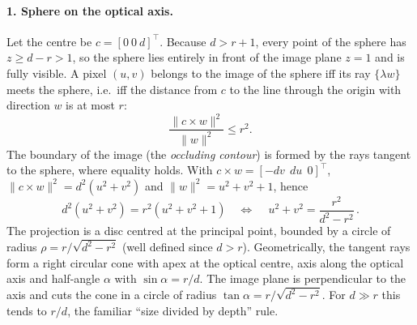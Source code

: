 \documentclass[11pt,a4paper]{article}
\begin{document}
\paragraph{1. Sphere on the optical axis.}
Let the centre be $c=[0\ 0\ d]^\top$. Because $d>r+1$, every point of the sphere has
$z\ge d-r>1$, so the sphere lies entirely in front of the image plane $z=1$ and is fully
visible. A pixel $(u,v)$ belongs to the image of the sphere iff its ray $\{\lambda w\}$
meets the sphere, i.e.\ iff the distance from $c$ to the line through the origin with
direction $w$ is at most $r$:
\begin{equation}
  \frac{\lVert c\times w\rVert^2}{\lVert w\rVert^2}\le r^2 .
\end{equation}
The boundary of the image (the \emph{occluding contour}) is formed by the rays tangent
to the sphere, where equality holds. With $c\times w=[-dv\ \ du\ \ 0]^\top$,
$\lVert c\times w\rVert^2=d^2(u^2+v^2)$ and $\lVert w\rVert^2=u^2+v^2+1$, hence
\begin{equation}
  d^2(u^2+v^2)=r^2(u^2+v^2+1)
  \quad\Longleftrightarrow\quad
  \boxed{\,u^2+v^2=\frac{r^2}{d^2-r^2}\,}.
\end{equation}
The projection is a disc centred at the principal point, bounded by a circle of radius
$\rho=r/\sqrt{d^2-r^2}$ (well defined since $d>r$).
Geometrically, the tangent rays form a right circular cone with apex at the optical
centre, axis along the optical axis and half-angle $\alpha$ with $\sin\alpha=r/d$. The
image plane is perpendicular to the axis and cuts the cone in a circle of radius
$\tan\alpha=r/\sqrt{d^2-r^2}$. For $d\gg r$ this tends to $r/d$, the familiar
``size divided by depth'' rule.
\end{document}

